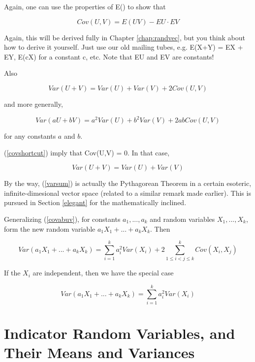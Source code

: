 Again, one can use the properties of E() to show that

\begin{equation}
\label{covshortcut}
Cov(U,V) = E(UV) - EU \cdot EV
\end{equation}

Again, this will be derived fully in Chapter \ref{chap:randvec}, but you
think about how to derive it yourself.  Just use our old mailing tubes,
e.g. E(X+Y) = EX + EY, E(cX) for a constant c, etc.  Note that EU and EV
are constants!

Also 

\begin{equation}
\label{genvarsum}
Var(U+V) = Var(U) + Var(V) + 2 Cov(U,V)
\end{equation}

and more generally,

\begin{equation}
\label{covabuv}
Var(aU+bV) = a^2 Var(U) + b^2 Var(V) + 2ab Cov(U,V)
\end{equation}

for any constants $a$ and $b$.

(\ref{covshortcut}) imply that Cov(U,V) = 0.  In that case,

\begin{equation}
\label{varsum}
Var(U+V) = Var(U) + Var(V) 
\end{equation}

By the way, (\ref{varsum}) is actually the Pythagorean Theorem in a
certain esoteric, infinite-dimesional vector space (related to a similar
remark made earlier).  This is pursued in Section \ref{elegant} for
the mathematically inclined.

Generalizing (\ref{covabuv}), for constants $a_1,...,a_k$ and random
variables $X_1,...,X_k$, form the new random variable $a_1 X_1 +...+ a_k
X_k$.  Then

\begin{equation}
Var(a_1 X_1 +...+ a_k X_k) = 
\sum_{i=1}^k a_i^2 Var(X_i) + 2 \sum_{1 \leq i < j \leq k}^k
Cov(X_i,X_j)
\end{equation}

If the $X_i$ are independent, then we have the special case

\begin{equation}
Var(a_1 X_1 +...+ a_k X_k) = 
\sum_{i=1}^k a_i^2 Var(X_i) 
\end{equation}

\section{Indicator Random Variables, and Their Means and Variances}
\label{indicator}


